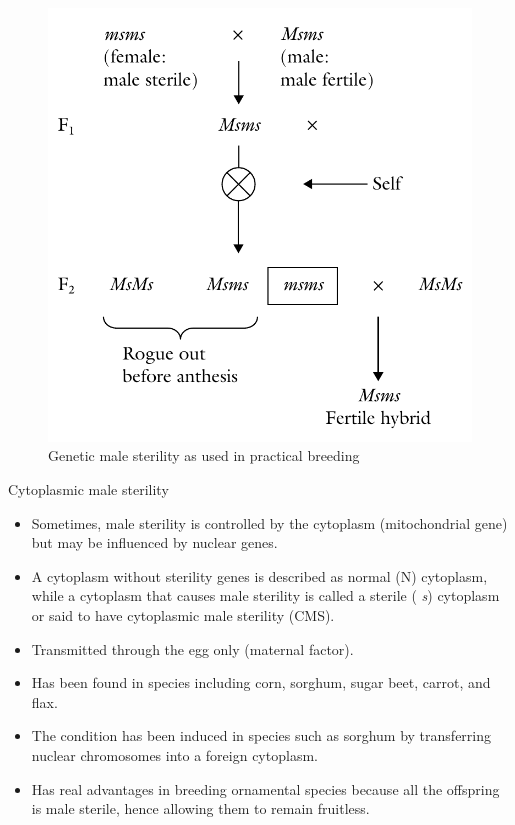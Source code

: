 \documentclass[11pt,ignorenonframetext,aspectratio=169]{beamer}
\providecommand{\tightlist}{%
  \setlength{\itemsep}{0pt}\setlength{\parskip}{0pt}}
\begin{document}
\begin{frame}{}
\protect\hypertarget{section-13}{}
\begin{figure}

{\centering \includegraphics[width=0.5\linewidth]{./images/gms_use} 

}

\caption{Genetic male sterility as used in practical breeding}\label{fig:gms-use}
\end{figure}
\end{frame}

\begin{frame}{Cytoplasmic male sterility}
\protect\hypertarget{cytoplasmic-male-sterility}{}
\begin{itemize}
\tightlist
\item
  Sometimes, male sterility is controlled by the cytoplasm
  (mitochondrial gene) but may be influenced by nuclear genes.
\item
  A cytoplasm without sterility genes is described as normal (N)
  cytoplasm, while a cytoplasm that causes male sterility is called a
  sterile ( \emph{s}) cytoplasm or said to have cytoplasmic male
  sterility (CMS).
\item
  Transmitted through the egg only (maternal factor).
\item
  Has been found in species including corn, sorghum, sugar beet, carrot,
  and flax.
\item
  The condition has been induced in species such as sorghum by
  transferring nuclear chromosomes into a foreign cytoplasm.
\item
  Has real advantages in breeding ornamental species because all the
  offspring is male sterile, hence allowing them to remain fruitless.
\end{itemize}
\end{frame}
\end{document}

